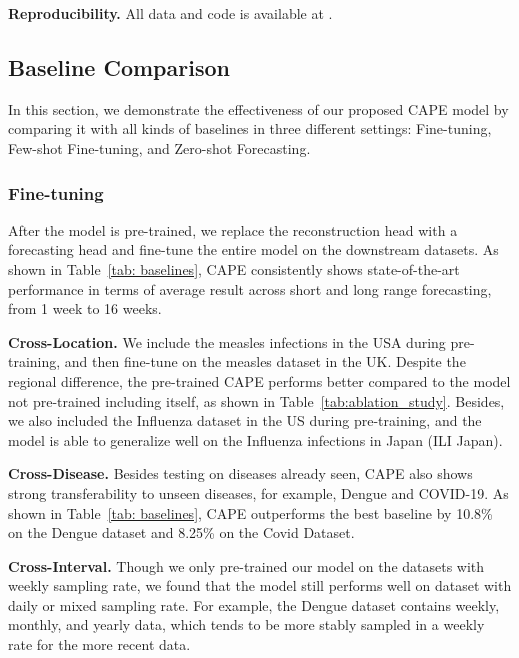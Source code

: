 \textbf{Reproducibility.} All data and code is available at \url{}.



\subsection{Baseline Comparison}

In this section, we demonstrate the effectiveness of our proposed CAPE model by comparing it with all kinds of baselines in three different settings: Fine-tuning, Few-shot Fine-tuning, and Zero-shot Forecasting.

\subsubsection{Fine-tuning} %
After the model is pre-trained, we replace the reconstruction head with a forecasting head and fine-tune the entire model on the downstream datasets. As shown in Table~\ref{tab: baselines}, CAPE consistently shows state-of-the-art performance in terms of average result across short and long range forecasting, from 1 week to 16 weeks. 

\textbf{Cross-Location.} We include the measles infections in the USA during pre-training, and then fine-tune on the measles dataset in the UK. Despite the regional difference, the pre-trained CAPE performs better compared to the model not pre-trained including itself, as shown in Table~\ref{tab:ablation_study}. Besides, we also included the Influenza dataset in the US during pre-training, and the model is able to generalize well on the Influenza infections in Japan (ILI Japan). 


\textbf{Cross-Disease.} Besides testing on diseases already seen, CAPE also shows strong transferability to unseen diseases, for example, Dengue and COVID-19. As shown in Table~\ref{tab: baselines}, CAPE outperforms the best baseline by 10.8\% on the Dengue dataset and 8.25\% on the Covid Dataset.

\textbf{Cross-Interval.} Though we only pre-trained our model on the datasets with weekly sampling rate, we found that the model still performs well on dataset with daily or mixed sampling rate. For example, the Dengue dataset contains weekly, monthly, and yearly data, which tends to be more stably sampled in a weekly rate for the more recent data. 

